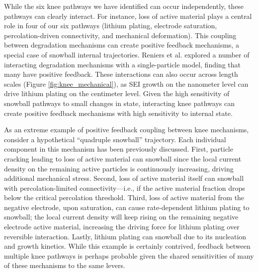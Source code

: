 \documentclass[journal=jpclcd,manuscript=article]{achemso}
\begin{document}
While the six knee pathways we have identified can occur independently, these pathways can clearly interact. For instance, loss of active material plays a central role in four of our six pathways (lithium plating, electrode saturation, percolation-driven connectivity, and mechanical deformation). This coupling between degradation mechanisms can create positive feedback mechanisms, a special case of snowball internal trajectories.
Reniers et al.\cite{reniers_review_2019} explored a number of interacting degradation mechanisms with a single-particle model, finding that many have positive feedback. These interactions can also occur across length scales (Figure \ref{fig:knee_mechanical}), as SEI growth on the nanometer level can drive lithium plating on the centimeter level.
Given the high sensitivity of snowball pathways to small changes in state, interacting knee pathways can create positive feedback mechanisms with high sensitivity to internal state.

As an extreme example of positive feedback coupling between knee mechanisms, consider a hypothetical “quadruple snowball” trajectory. Each individual component in this mechanism has been previously discussed. First, particle cracking leading to loss of active material can snowball since the local current density on the remaining active particles is continuously increasing, driving additional mechanical stress. Second, loss of active material itself can snowball with percolation-limited connectivity---i.e., if the active material fraction drops below the critical percolation threshold. Third, loss of active material from the negative electrode, upon saturation, can cause rate-dependent lithium plating to snowball; the local current density will keep rising on the remaining negative electrode active material, increasing the driving force for lithium plating over reversible interaction. Lastly, lithium plating can snowball due to its nucleation and growth kinetics. While this example is certainly contrived, feedback between multiple knee pathways is perhaps probable given the shared sensitivities of many of these mechanisms to the same levers. 
\end{document}
